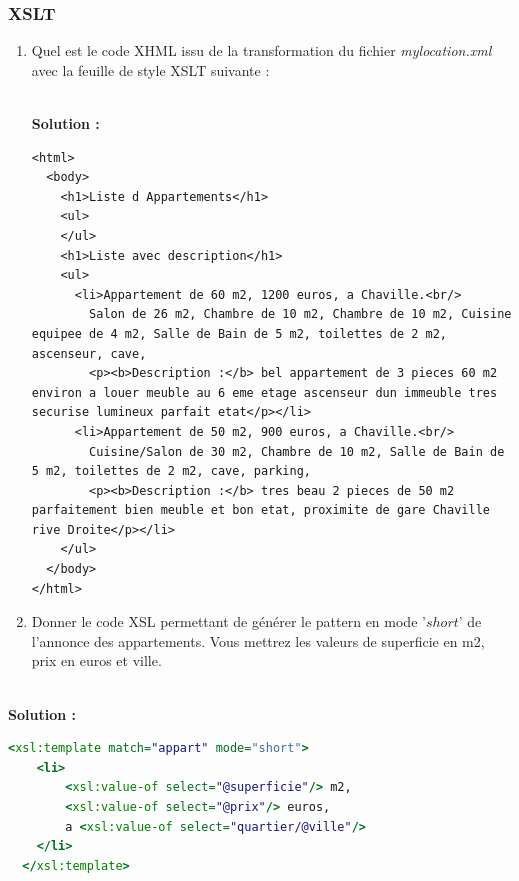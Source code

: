 \documentclass[9pt,a4paper]{article}
\newenvironment{solution}[0]{
~\\ \color{red} \textbf{Solution :}\color{black}}{%
}
\begin{document}
\subsubsection*{XSLT}
\begin{enumerate}
	\item[5.] Quel est le code XHML issu de la transformation du fichier
	\textit{mylocation.xml} avec la feuille de style XSLT suivante :

\begin{center}
\begin{minipage}{\textwidth}

\end{minipage} 
\end{center}

\begin{solution}
\begin{verbatim}
<html>
  <body>
    <h1>Liste d Appartements</h1>
    <ul>
    </ul>
    <h1>Liste avec description</h1>
    <ul>
      <li>Appartement de 60 m2, 1200 euros, a Chaville.<br/>
        Salon de 26 m2, Chambre de 10 m2, Chambre de 10 m2, Cuisine equipee de 4 m2, Salle de Bain de 5 m2, toilettes de 2 m2, ascenseur, cave,
        <p><b>Description :</b> bel appartement de 3 pieces 60 m2 environ a louer meuble au 6 eme etage ascenseur dun immeuble tres securise lumineux parfait etat</p></li>
      <li>Appartement de 50 m2, 900 euros, a Chaville.<br/>
        Cuisine/Salon de 30 m2, Chambre de 10 m2, Salle de Bain de 5 m2, toilettes de 2 m2, cave, parking, 
        <p><b>Description :</b> tres beau 2 pieces de 50 m2 parfaitement bien meuble et bon etat, proximite de gare Chaville rive Droite</p></li>
    </ul>
  </body>
</html>
\end{verbatim}
\end{solution}
	\item[6.] Donner le code XSL permettant de générer le pattern en mode '$short$' de l'annonce des appartements. Vous mettrez les valeurs de superficie en m2, prix en euros et ville.
\end{enumerate}
\begin{solution}
\begin{lstlisting}[inputencoding=utf8/latin1,basicstyle=\small,
language=XSLT,breaklines=true]
  <xsl:template match="appart" mode="short">
    <li>
    	<xsl:value-of select="@superficie"/> m2,
    	<xsl:value-of select="@prix"/> euros,
    	a <xsl:value-of select="quartier/@ville"/>
    </li>
  </xsl:template>
\end{lstlisting}
\end{solution}
\end{document}
